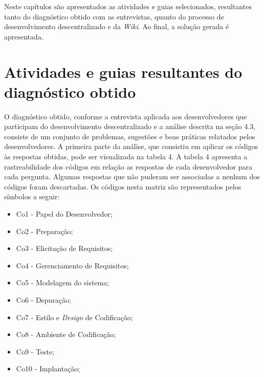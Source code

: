 Neste capítulos são apresentados as atividades e guias selecionados, resultantes tanto do diagnóstico obtido com as entrevistas, quanto do processo de desenvolvimento descentralizado e da \textit{Wiki}. Ao final, a solução gerada é apresentada.

\section{Atividades e guias resultantes do diagnóstico obtido}

O diagnóstico obtido, conforme a entrevista aplicada aos desenvolvedores que participam do desenvolvimento descentralizado e a análise descrita na seção 4.3, consiste de um conjunto de problemas, sugestões e boas práticas relatados pelos desenvolvedores. A primeira parte da análise, que consistiu em aplicar os códigos às respostas obtidas, pode ser visualizada na tabela 4. A tabela 4 apresenta a rastreabilidade dos códigos em relação as respostas de cada desenvolvedor para cada pergunta. Algumas respostas que não puderam ser associadas a nenhum dos códigos foram descartadas. Os códigos nesta matriz são representados pelos símbolos a seguir:

\begin{itemize}
\item Co1 - Papel do Desenvolvedor;
\item Co2 - Preparação;
\item Co3 - Elicitação de Requisitos;
\item Co4 - Gerenciamento de Requisitos;
\item Co5 - Modelagem do sistema;
\item Co6 - Depuração;
\item Co7 - Estilo e \textit{Design} de Codificação;
\item Co8 - Ambiente de Codificação;
\item Co9 - Teste;
\item Co10 - Implantação;
\end{itemize}
\clearpage

